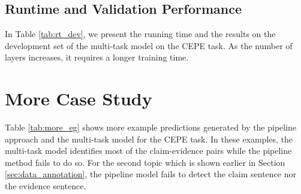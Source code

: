 \documentclass[11pt]{article}
\begin{document}
\subsection{Runtime and Validation Performance}

In Table \ref{tab:rt_dev}, we present the running time and the results on the development set of the multi-task model on the CEPE task.
As the number of layers increases, it requires a longer training time.


\begin{table}[H]
	\centering
{}
\caption{Runtime (RT) per epoch (minutes), the precision (P.), recall (R.) and F on the development set of the multi-task model with differnt numbers of layers.}
	\label{tab:rt_dev}
\end{table}


\section{More Case Study}
\label{sec:more_eg}

Table \ref{tab:more_eg} shows more example predictions generated by the pipeline approach and the multi-task model for the CEPE task.
In these examples, the multi-task model identifies most of the claim-evidence pairs while the pipeline method fails to do so.
For the second topic which is shown earlier in Section \ref{sec:data_annotation}, the pipeline model fails to detect the claim sentence nor the evidence sentence.
\end{document}
